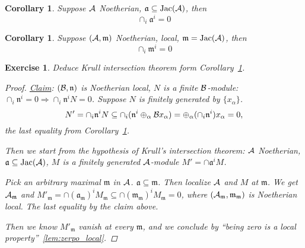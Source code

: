 \documentclass[11pt]{article}
\newtheorem{cor}[thm]{Corollary}
\newtheorem{exercise}[thm]{Exercise}
\newcommand{\sca}{{\mathfrak a}}
\newcommand{\scm}{{\mathfrak m}}
\newcommand{\scn}{{\mathfrak n}}
\newcommand{\cala}{{\cal A}}
\newcommand{\calb}{{\cal B}}
\newcommand{\Lrta}{\Longrightarrow}
\begin{document}
\begin{cor} Suppose $\cala$ Noetherian, 
$\sca\subseteq \text{Jac}(\cala)$, then
$$\cap_i\sca^i=0$$
\end{cor}
\begin{cor}\label{cor:cor3}
Suppose $(\cala,\scm)$ Noetherian, local, $\scm=\text{Jac}(\cala)$, then
$$
\cap_i\scm^i=0
$$
\end{cor}
\begin{exercise}
Deduce Krull intersection theorem form Corollary~\ref{cor:cor3}.
{\color{red}
\begin{proof}
\underline{Claim}: $(\calb,\scn)$ is Noetherian local, $N$ is a finite $\calb$-module: $\cap_i\scn^i=0\Lrta\cap_i\scn^i N=0$. Suppose $N$ is finitely generated by $\{x_\alpha\}$. 
$$
N'=\cap_i\scn^i N\subseteq \cap_i(\scn^i\oplus_\alpha \calb x_\alpha)=\oplus_\alpha(\cap_i\scn^i)x_\alpha=0,
$$
the last equality from Corollary~\ref{cor:cor3}.


Then we start from the hypothesis of Krull's intersection theorem: $\cala$ Noetherian, $\sca\subseteq\text{Jac}(\cala)$, $M$ is a finitely generated $\cala$-module $M'=\cap\sca^i M$.

Pick an arbitrary maximal $\scm$ in $\cala$. $\sca\subseteq\scm$. Then localize $\cala$ and $M$ at $\scm$. We get $\cala_\scm$ and $M'_\scm=\cap (\sca_\scm)^i M_\scm\subseteq\cap(\scm_\scm)^i M_\scm=0$, where $(\cala_\scm,\scm_\scm)$ is Noetherian local. The last equality by the claim above.

Then we know $M'_\scm$ vanish at every $\scm$, and we conclude by ``being zero is a local property''~\ref{lem:zerpo_local}.  

\end{proof}
}


\end{exercise}
\end{document}
